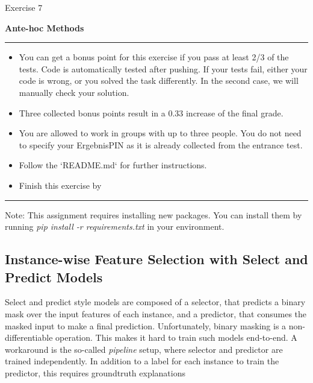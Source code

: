\documentclass[a4paper]{article}
\begin{document}
{\noindent\LARGE Exercise 7\par}
\vspace{8pt}
{\noindent\huge\textbf{Ante-hoc Methods}}
\vspace{20pt}

\par\noindent\rule{\textwidth}{0.2pt}
\begin{itemize}
    \item You can get a bonus point for this exercise if you pass at least 2/3 of the tests. Code is automatically tested after pushing. If your tests fail, either your code is wrong, or you solved the task differently. In the second case, we will manually check your solution.
    \item Three collected bonus points result in a 0.33 increase of the final grade.
    \item You are allowed to work in groups with up to three people. You do not need to specify your ErgebnisPIN as it is already collected from the entrance test.
    \item Follow the `README.md` for further instructions.
    \item Finish this exercise by \color{red}{1st December, 2021 at 11:59 pm.}
\end{itemize}
\par\noindent\rule{\textwidth}{0.2pt}
\vspace{10pt}

\noindent
Note: This assignment requires installing new packages.
You can install them by running \textit{pip install -r requirements.txt} in your environment.

\noindent
\subsection*{Instance-wise Feature Selection with Select and Predict Models}
Select and predict style models are composed of a selector, that predicts a binary mask over the input features of each instance, and a predictor, that consumes the masked input to make a final prediction.
Unfortunately, binary masking is a non-differentiable operation.
This makes it hard to train such models end-to-end.
A workaround is the so-called \textit{pipeline} setup, where selector and predictor are trained independently.
In addition to a label for each instance to train the predictor, this requires groundtruth explanations
\end{document}

